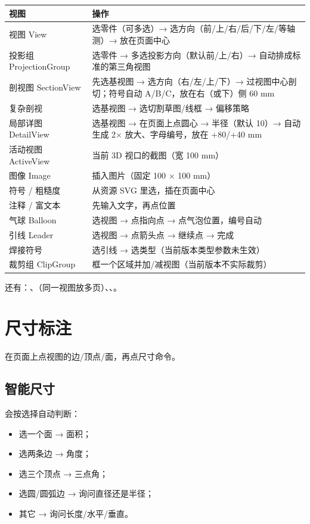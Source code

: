 \begin{center}
\small
\begin{tabularx}{\linewidth}{@{}lX@{}}
\toprule
\textbf{视图} & \textbf{操作} \\
\midrule
视图 View & 选零件（可多选）→ 选方向（前/上/右/后/下/左/等轴测）→ 放在页面中心 \\
投影组 ProjectionGroup & 选零件 → 多选投影方向（默认前/上/右）→ 自动排成标准的第三角视图 \\
剖视图 SectionView & 先选基视图 → 选方向（右/左/上/下）→ 过视图中心剖切；符号自动 A/B/C，放在右（或下）侧 60 mm \\
复杂剖视 & 选基视图 → 选切割草图/线框 → 偏移策略 \\
局部详图 DetailView & 选基视图 → 在页面上点圆心 → 半径（默认 10）→ 自动生成 2× 放大、字母编号，放在 +80/+40 mm \\
活动视图 ActiveView & 当前 3D 视口的截图（宽 100 mm）\\
图像 Image & 插入图片（固定 100 × 100 mm）\\
符号 / 粗糙度 & 从资源 SVG 里选，插在页面中心 \\
注释 / 富文本 & 先输入文字，再点位置 \\
气球 Balloon & 选视图 → 点指向点 → 点气泡位置，编号自动 \\
引线 Leader & 选视图 → 点箭头点 → 继续点 → 完成 \\
焊接符号 & 选引线 → 选类型（当前版本类型参数未生效）\\
裁剪组 ClipGroup & 框一个区域并加/减视图（当前版本不实际裁剪）\\
\bottomrule
\end{tabularx}
\end{center}

还有：、（同一视图放多页）、、。

\section{尺寸标注}

在页面上点视图的边/顶点/面，再点尺寸命令。

\subsection{智能尺寸}

 会按选择自动判断：

\begin{itemize}
  \item 选一个面 → 面积；
  \item 选两条边 → 角度；
  \item 选三个顶点 → 三点角；
  \item 选圆/圆弧边 → 询问直径还是半径；
  \item 其它 → 询问长度/水平/垂直。
\end{itemize}

